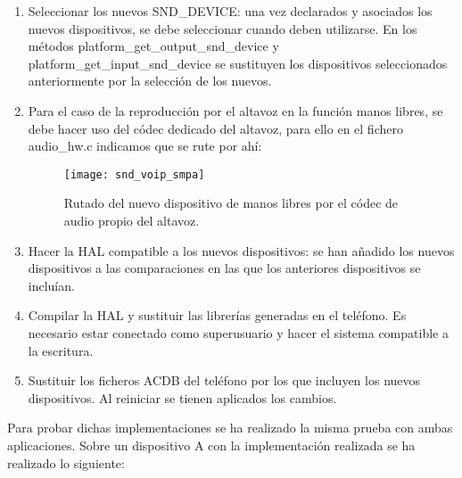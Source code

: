 \begin{enumerate}
\begin{figure}[H]
	\end{figure}
	\item Seleccionar los nuevos SND\_DEVICE: una vez declarados y asociados los nuevos dispositivos, se debe seleccionar cuando deben utilizarse. En los métodos platform\_get\_output\_snd\_device y platform\_get\_input\_snd\_device se sustituyen los dispositivos seleccionados anteriormente por la selección de los nuevos.
	\item Para el caso de la reproducción por el altavoz en la función manos libres, se debe hacer uso del códec dedicado del altavoz, para ello en el fichero audio\_hw.c indicamos que se rute por ahí:
	\begin{figure}[H]
		\centering
		\texttt{[image: snd\_voip\_smpa]}
		\caption{Rutado del nuevo dispositivo de manos libres por el códec de audio propio del altavoz.} 
		\label{fig:snd_voip_smpa}
	\end{figure}
	\item Hacer la \gls{HAL} compatible a los nuevos dispositivos: se han añadido los nuevos dispositivos a las comparaciones en las que los anteriores dispositivos se incluían.
	\item Compilar la \gls{HAL} y sustituir las librerías generadas en el teléfono. Es necesario estar conectado como superusuario y hacer el sistema compatible a la escritura.
	\item Sustituir los ficheros \gls{ACDB} del teléfono por los que incluyen los nuevos dispositivos. Al reiniciar se tienen aplicados los cambios.
\end{enumerate}

Para probar dichas implementaciones se ha realizado la misma prueba con ambas aplicaciones. Sobre un dispositivo A con la implementación realizada se ha realizado lo siguiente: 

